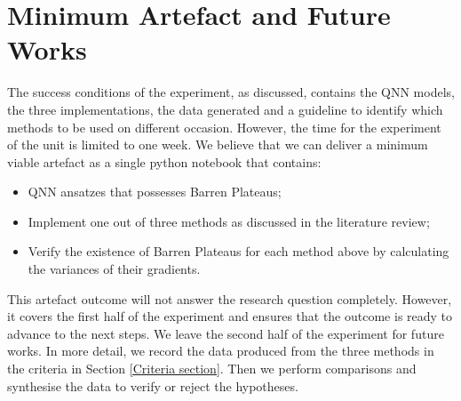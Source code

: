 \section{Minimum Artefact and Future Works}

The success conditions of the experiment, as discussed, contains the QNN models, the three implementations, the data generated and a guideline to identify which methods to be used on different occasion.
However, the time for the experiment of the unit is limited to one week. We believe that we can deliver a minimum viable artefact as a single python notebook that contains:
\begin{itemize}
    \item QNN ansatzes that possesses Barren Plateaus;
    \item Implement one out of three methods as discussed in the literature review;
    \item Verify the existence of Barren Plateaus for each method above by calculating the variances of their gradients.
\end{itemize}

This artefact outcome will not answer the research question completely. 
However, it covers the first half of the experiment and ensures that the outcome is ready to advance to the next steps.
We leave the second half of the experiment for future works.
In more detail, we record the data produced from the three methods in the criteria in Section \ref{Criteria section}. 
Then we perform comparisons and synthesise the data to verify or reject the hypotheses.
